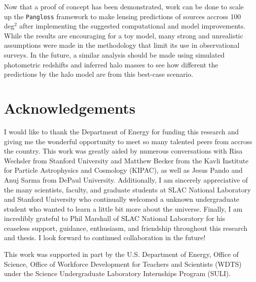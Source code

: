 \documentclass[%
 reprint,
 amsmath,amssymb,
 aps,nofootinbib
]{revtex4-1}
\begin{document}
Now that a proof of concept has been demonstrated, work can be done to scale up the \texttt{Pangloss} framework to make lensing predictions of sources accross 100 deg$^2$ after implementing the suggested computational and model improvements. While the results are encouraging for a toy model, many strong and unrealistic assumptions were made in the methodology that limit its use in observational surveys. In the future, a similar analysis should be made using simulated photometric redshifts and inferred halo masses to see how different the predictions by the halo model are from this best-case scenario.

\vspace{0.04 in}

\section{Acknowledgements}

I would like to thank the Department of Energy for funding this research and giving me the wonderful opportunity to meet so many talented peers from accross the country. This work was greatly aided by numerous conversations with Risa Wechsler from Stanford University and Matthew Becker from the Kavli Institute for Particle Astrophysics and Cosmology (KIPAC), as well as Jesus Pando and Anuj Sarma from DePaul University. Additionally, I am sincerely appreciative of the many scientists, faculty, and graduate students at SLAC National Laboratory and Stanford University who continually welcomed a unknown undergraduate student who wanted to learn a little bit more about the universe. Finally, I am incredibly grateful to Phil Marshall of SLAC National Laboratory for his ceaseless support, guidance, enthusiasm, and friendship throughout this research and thesis. I look forward to continued collaboration in the future!

This work was supported in part by the U.S. Department of Energy, Office of Science, Office of Workforce Development for Teachers and Scientists (WDTS) under the Science Undergraduate Laboratory Internships Program (SULI).


\onecolumngrid

\vspace{0.25 in}
\end{document}

